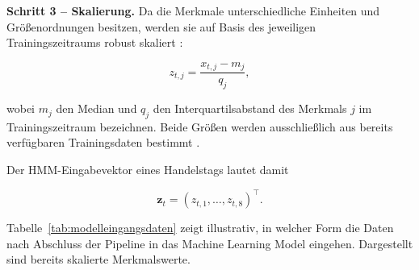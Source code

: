 \vspace{0.5cm}

\textbf{Schritt 3 – Skalierung.} Da die Merkmale unterschiedliche Einheiten und Größenordnungen besitzen, werden sie auf Basis des jeweiligen Trainingszeitraums robust skaliert \cite{noauthor_robustscaler_nodate}:

$$
z_{t,j}
=
\frac{x_{t,j}-m_j}{q_j},
$$

wobei $m_j$ den Median und $q_j$ den Interquartilsabstand des Merkmals $j$ im Trainingszeitraum bezeichnen. Beide Größen werden ausschließlich aus bereits verfügbaren Trainingsdaten bestimmt \cite{yang_information_leakage_2024}.

\vspace{0.5cm}

Der HMM-Eingabevektor eines Handelstags lautet damit

$$
\mathbf z_t
=
(z_{t,1},\ldots,z_{t,8})^\top.
$$

Tabelle~\ref{tab:modelleingangsdaten} zeigt illustrativ, in welcher Form die Daten nach Abschluss der Pipeline in das Machine Learning Model eingehen. Dargestellt sind bereits skalierte Merkmalswerte.

